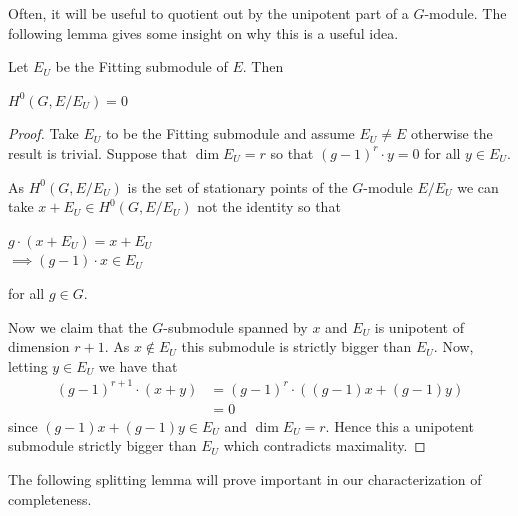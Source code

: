 Often, it will be useful to quotient out by the unipotent part of a $G$-module.
The following lemma gives some insight on why this is a useful idea.
\begin{lemma}\label{lemma:fitting-submodule}
    Let $E_U$ be the Fitting submodule of $E$. Then
    \begin{center}
        $H^0(G, E/E_U) = 0$
    \end{center}
\end{lemma}

\begin{proof}
    Take $E_U$ to be the Fitting submodule and assume $E_U \neq E$ otherwise the result is trivial.
    Suppose that $\dim E_U = r$ so that $(g-1)^r \cdot y = 0$ for all $y \in E_U$.

    As $H^0(G, E/E_U)$ is the set of stationary points of the $G$-module $E/E_U$ we
    can take $x + E_U \in H^0(G, E/E_U)$ not the identity so that
    \begin{center}
        $g\cdot (x + E_U) = x+ E_U$\\
        $ \implies (g - 1)\cdot x \in E_U$
    \end{center}
    for all $g \in G$.

    Now we claim that the $G$-submodule spanned by $x$ and $E_U$ is unipotent of
    dimension $r+1$. As $x \notin E_U$ this submodule is strictly bigger than
    $E_U$. Now, letting $y \in E_U$ we have that
    \begin{align*}
        (g-1)^{r+1}\cdot (x + y) & = (g-1)^{r} \cdot ((g-1)x + (g-1)y) \\
                                 & = 0
    \end{align*}
    since $(g-1)x + (g-1)y \in E_U$ and $\dim E_U = r$. Hence this a unipotent submodule strictly bigger than $E_U$ which contradicts maximality.
\end{proof}

The following splitting lemma will prove important in our characterization of
completeness.

